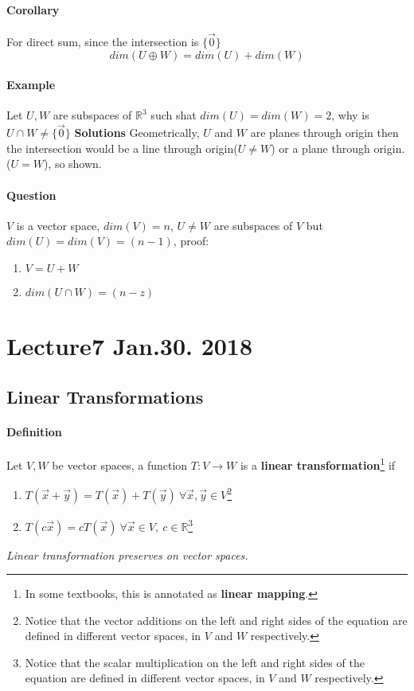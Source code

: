 \documentclass[11pt]{article}
\begin{document}
	\paragraph{Corollary} For direct sum, since the intersection is $\{\vec{0}\}$
	\[
		dim(U \oplus W) = dim(U) + dim(W)
	\]
	\paragraph{Example} Let $U,W$ are subspaces of $\mathbb{R}^3$ such shat $dim(U)= dim(W) = 2$, why is $U \cap W \neq \{\vec{0}\}$
	\newline \quad
	\newline \textbf{Solutions} Geometrically, $U$ and $W$ are planes through origin then the intersection would be a line through origin($U \neq W$) or a plane through origin.($U = W$), so shown.
	\paragraph{Question} $V$ is a vector space, $dim(V) = n$, $U \neq W$ are subspaces of $V$ but $dim(U) = dim(V) = (n - 1)$, proof:
	\begin{enumerate}
		\item $V = U + W$
		\item $dim(U \cap W) = (n - z)$
	\end{enumerate}
	
	\section{Lecture7 Jan.30. 2018}
	\subsection{Linear Transformations}
	\paragraph{Definition} Let $V, W$ be vector spaces, a function $T: V \to W$ is a \textbf{linear transformation}\footnote{In some textbooks, this is annotated as \textbf{linear mapping}.} if 
	\begin{enumerate}
		\item $T(\vec{x} + \vec{y}) = T(\vec{x}) + T(\vec{y})\ \forall \vec{x}, \vec{y} \in V$\footnote{Notice that the vector additions on the left and right sides of the equation are defined in different vector spaces, in $V$ and $W$ respectively.}
		\item $T(c\vec{x}) = cT(\vec{x})\ \forall \vec{x} \in V,\ c \in \mathbb{R}$\footnote{Notice that the scalar multiplication on the left and right sides of the equation are defined in different vector spaces, in $V$ and $W$ respectively.}
	\end{enumerate}
	\emph{Linear transformation preserves  on vector spaces.}
	
\end{document}
